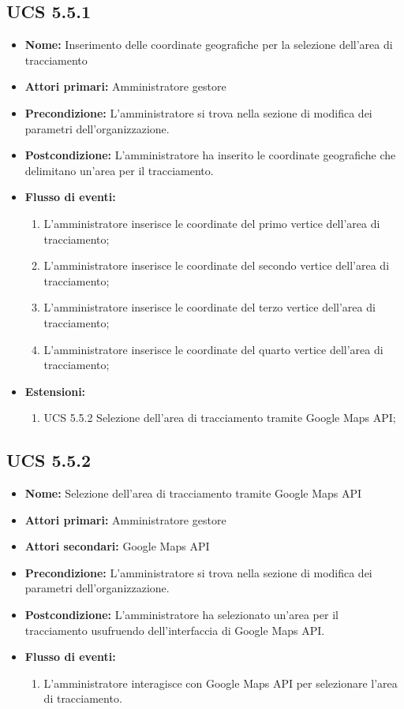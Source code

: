 \subsection{UCS 5.5.1}%
\begin{itemize}
\item \textbf{Nome:} Inserimento delle coordinate geografiche per la selezione dell'area di tracciamento
\item \textbf{Attori primari:} Amministratore gestore
\item \textbf{Precondizione:} L'amministratore si trova nella sezione di modifica dei parametri dell'organizzazione.
\item \textbf{Postcondizione:} L'amministratore ha inserito le coordinate geografiche che delimitano un'area per il tracciamento.
\item \textbf{Flusso di eventi:}
\begin{enumerate}
    \item L'amministratore inserisce le coordinate del primo vertice dell'area di tracciamento;
    \item L'amministratore inserisce le coordinate del secondo vertice dell'area di tracciamento;
    \item L'amministratore inserisce le coordinate del terzo vertice dell'area di tracciamento;
    \item L'amministratore inserisce le coordinate del quarto vertice dell'area di tracciamento;
\end{enumerate}
\item \textbf{Estensioni:}
\begin{enumerate}
    \item UCS 5.5.2 Selezione dell'area di tracciamento tramite Google Maps API;
\end{enumerate}
\end{itemize}

\subsection{UCS 5.5.2}%
\begin{itemize}
\item \textbf{Nome:} Selezione dell'area di tracciamento tramite Google Maps API
\item \textbf{Attori primari:} Amministratore gestore
\item \textbf{Attori secondari:} Google Maps API
\item \textbf{Precondizione:} L'amministratore si trova nella sezione di modifica dei parametri dell'organizzazione.
\item \textbf{Postcondizione:} L'amministratore ha selezionato un'area per il tracciamento usufruendo dell'interfaccia di Google Maps API.
\item \textbf{Flusso di eventi:}
\begin{enumerate}
    \item L'amministratore interagisce con Google Maps API per selezionare l'area di tracciamento.
\end{enumerate}
\end{itemize}